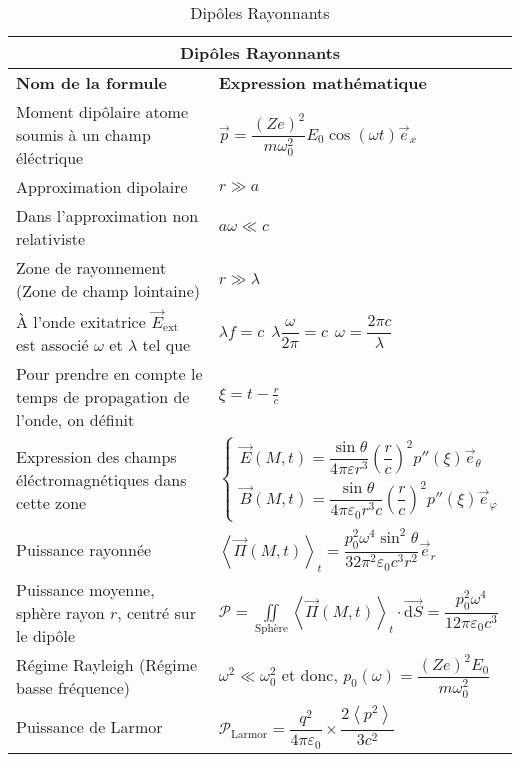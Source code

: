 \documentclass[10pt,a4paper,titlepage,portrait]{article}
\renewcommand{\d}
{
    \mathrm{d}
}
\renewcommand{\arraystretch}{2}
\newcommand{\av}[2]
{
    \left\langle#1\right\rangle_{#2}
}
\begin{document}
\begin{table}[H]
    \centering
    \renewcommand{\arraystretch}{1.5} %
    \setlength{\tabcolsep}{8pt} %
    \begin{tabular}{@{}p{9cm}p{10cm}@{}}
        \toprule
        \multicolumn{2}{c}{\textbf{Dipôles Rayonnants}} \\
        \midrule
        \textbf{Nom de la formule} & \textbf{Expression mathématique} \\
        \midrule
        Moment dipôlaire atome soumis à un champ éléctrique & $\vec p = \dfrac{(Ze)^2}{m\omega_0^2}E_0\cos(\omega t)\vec e_x$ \\
        Approximation dipolaire & $r \gg a$ \\ 
        Dans l'approximation non relativiste & $a\omega \ll c$ \\
        Zone de rayonnement (Zone de champ lointaine) & $r \gg \lambda$ \\
        À l'onde exitatrice $\vec E_{\text{ext}}$ est associé $\omega$ et $\lambda$ tel que & $\lambda f = c \ \ \lambda\dfrac{\omega}{2\pi} = c \ \ \omega = \dfrac{2\pi c}{\lambda}$ \\
        Pour prendre en compte le temps de propagation de l'onde, on définit & $\xi = t - \frac{r}{c}$ \\
        Expression des champs éléctromagnétiques dans cette zone & $\left\{ \begin{array}{l} \vec E (M,t) = \dfrac{\sin \theta}{4\pi \varepsilon r^3} \left(\dfrac{r}{c}\right)^2 p''(\xi)\vec e_{\theta} \\ \vec B (M,t) = \dfrac{\sin \theta}{4\pi \varepsilon_0 r^3 c}\left(\dfrac{r}{c}\right)^2 p''(\xi) \vec e_{\varphi}\end{array}\right.$ \\
        Puissance rayonnée & $\av{\vec{\Pi} (M,t)}{t} = \dfrac{p_0^2 \omega^4 \sin^2 \theta}{32 \pi^2 \varepsilon_0 c^3 r^2}\vec e_r$ \\
        Puissance moyenne, sphère rayon $r$, centré sur le dipôle & $\displaystyle \mathcal{P} = \iint\limits_{\text{Sphère}} \av{\vec \Pi (M,t)}{t} \cdot \vec{\d S} = \dfrac{p_0^2 \omega^4}{12\pi \varepsilon_0 c^3}$ \\
        Régime Rayleigh (Régime basse fréquence) & $\omega^2 \ll \omega_0^2$ et donc, $p_0(\omega) = \dfrac{(Ze)^2E_0}{m\omega_0^2}$ \\
        Puissance de Larmor & $\mathcal P_{\text{Larmor}} = \dfrac{q^2}{4\pi \varepsilon_0} \times \dfrac{2\av{p^2}{}}{3c^2}$ \\


    \bottomrule
\end{tabular}
\caption{Dipôles Rayonnants}
\label{tab:der}
\end{table}
\end{document}
